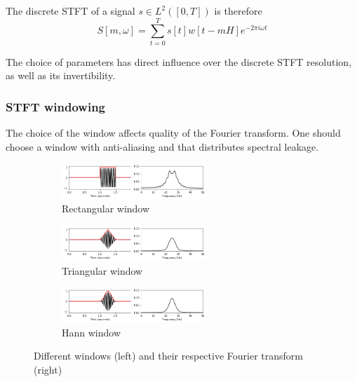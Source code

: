 \documentclass[
  american,
]{article}
\begin{document}
The discrete STFT of a signal \(s\in L^2([0,T])\) is therefore
\begin{equation}
S[m,\omega] = \sum_{t=0}^{T} s[t]w[t-mH]e^{-2\pi i\omega t}
\end{equation}

The choice of parameters has direct influence over the discrete STFT
resolution, as well as its invertibility.

\hypertarget{stft-windowing}{%
\subsubsection{STFT windowing}\label{stft-windowing}}

The choice of the window affects quality of the Fourier transform.
One should choose a window with anti-aliasing and that distributes
spectral leakage.

\begin{figure}[H]
    \centering
    \begin{subfigure}[t]{\textwidth}
        \centering
        \includegraphics[width=0.6\textwidth]{img/w_rectangle.png}
        \caption{Rectangular window}
    \end{subfigure}
    \begin{subfigure}[t]{\textwidth}
        \centering
        \includegraphics[width=0.6\textwidth]{img/w_triangle.png}
        \caption{Triangular window}
    \end{subfigure}
    \begin{subfigure}[t]{\textwidth}
        \centering
        \includegraphics[width=0.6\textwidth]{img/w_hann.png}
        \caption{Hann window}
    \end{subfigure}
    \caption{Different windows (left) and their respective Fourier transform (right)}
\end{figure}
\end{document}
